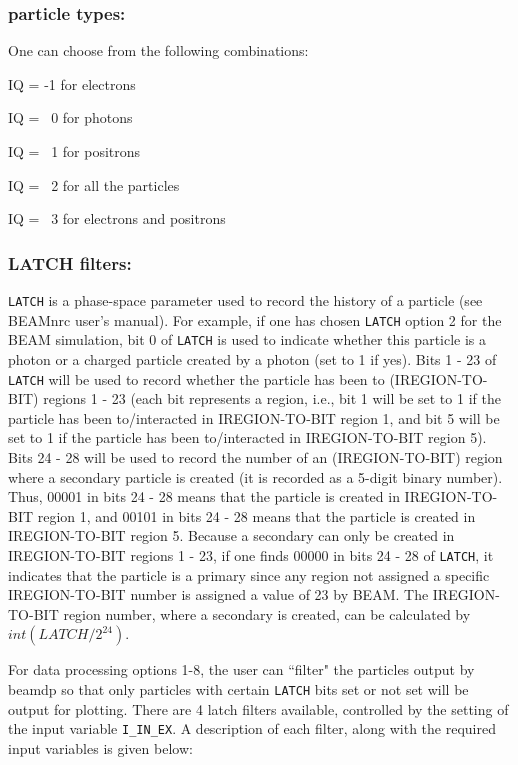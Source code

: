 \documentclass[12pt,twoside]{article}
\begin{document}
\noindent
\subsubsection{particle types:}

\noindent
One can choose from the following combinations:


IQ = -1 for electrons

IQ = ~0 for photons

IQ = ~1 for positrons

IQ = ~2 for all the particles

IQ = ~3 for electrons and positrons

\noindent
\subsubsection{LATCH filters:}

\noindent
\verb+LATCH+ is a phase-space parameter used to record the history of a
particle (see BEAMnrc user's manual). For example, if one has chosen
\verb+LATCH+ option 2 for the BEAM simulation,  bit 0 of \verb+LATCH+ is
used to indicate whether this particle is a photon or a charged particle
created by a photon (set to 1 if yes). Bits 1 - 23 of \verb+LATCH+ will be
used to record whether the particle has been to (IREGION-TO-BIT) regions 1
- 23 (each bit represents a region, i.e., bit 1 will be set to 1 if the
particle has been to/interacted in IREGION-TO-BIT region 1, and bit 5 will
be set to 1 if the particle has been to/interacted in IREGION-TO-BIT
region 5). Bits 24 - 28 will be used to record the number of an
(IREGION-TO-BIT) region where a secondary particle is created (it is
recorded as a 5-digit binary number). Thus, 00001 in bits 24 - 28 means
that the particle is created in IREGION-TO-BIT region 1, and 00101 in bits
24 - 28 means that the particle is created in IREGION-TO-BIT region 5.
Because a secondary can only be created in IREGION-TO-BIT regions 1 - 23,
if one finds 00000 in bits 24 - 28 of \verb+LATCH+, it indicates that the
particle is  a primary since any region not assigned a specific
IREGION-TO-BIT number is assigned a value of 23 by BEAM.  The
IREGION-TO-BIT region number, where a secondary is created, can be
calculated by $int(LATCH/2^{24})$.


\noindent
For data processing options 1-8, the user can ``filter" the particles output
by beamdp so that only
particles with certain \verb+LATCH+ bits set or not set will be output
for plotting.  There are 4 latch filters available, controlled by the setting
of the input variable {\tt I\_IN\_EX}.  A description of each filter, along
with the required input variables is given below:
\end{document}
